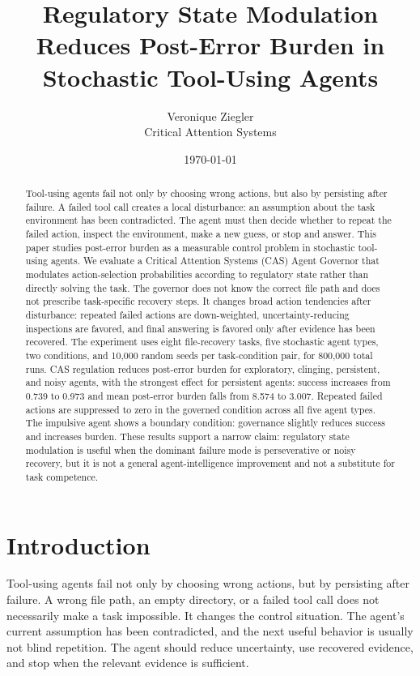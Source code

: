 \documentclass[11pt]{article}
\title{Regulatory State Modulation Reduces Post-Error Burden in Stochastic Tool-Using Agents}
\author{Veronique Ziegler\\Critical Attention Systems}
\date{\today}
\begin{document}
\maketitle

\begin{abstract}
Tool-using agents fail not only by choosing wrong actions, but also by persisting after failure. A failed tool call creates a local disturbance: an assumption about the task environment has been contradicted. The agent must then decide whether to repeat the failed action, inspect the environment, make a new guess, or stop and answer. This paper studies post-error burden as a measurable control problem in stochastic tool-using agents. We evaluate a Critical Attention Systems (CAS) Agent Governor that modulates action-selection probabilities according to regulatory state rather than directly solving the task. The governor does not know the correct file path and does not prescribe task-specific recovery steps. It changes broad action tendencies after disturbance: repeated failed actions are down-weighted, uncertainty-reducing inspections are favored, and final answering is favored only after evidence has been recovered. The experiment uses eight file-recovery tasks, five stochastic agent types, two conditions, and 10,000 random seeds per task-condition pair, for 800,000 total runs. CAS regulation reduces post-error burden for exploratory, clinging, persistent, and noisy agents, with the strongest effect for persistent agents: success increases from 0.739 to 0.973 and mean post-error burden falls from 8.574 to 3.007. Repeated failed actions are suppressed to zero in the governed condition across all five agent types. The impulsive agent shows a boundary condition: governance slightly reduces success and increases burden. These results support a narrow claim: regulatory state modulation is useful when the dominant failure mode is perseverative or noisy recovery, but it is not a general agent-intelligence improvement and not a substitute for task competence.
\end{abstract}

\section{Introduction}

Tool-using agents fail not only by choosing wrong actions, but by persisting after failure. A wrong file path, an empty directory, or a failed tool call does not necessarily make a task impossible. It changes the control situation. The agent's current assumption has been contradicted, and the next useful behavior is usually not blind repetition. The agent should reduce uncertainty, use recovered evidence, and stop when the relevant evidence is sufficient.
\end{document}
